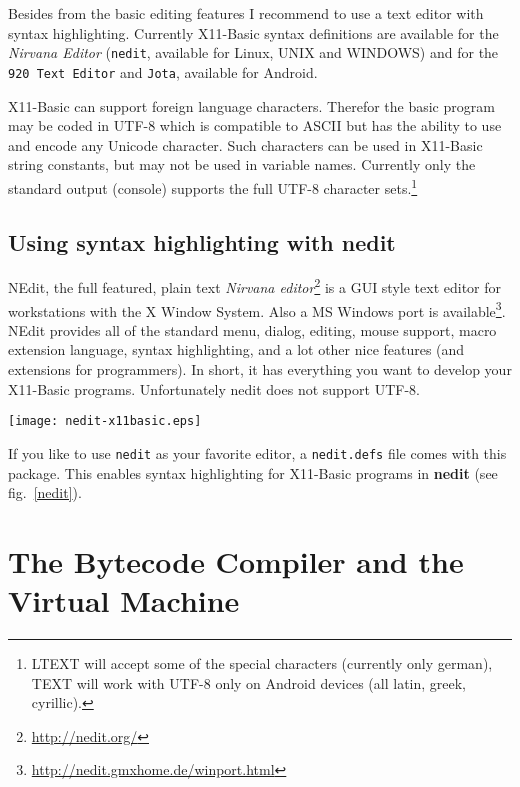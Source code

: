 Besides from the basic editing features I recommend to use a text editor with
syntax highlighting. Currently X11-Basic syntax definitions are available  for
the {\it Nirvana Editor} (\verb|nedit|, available for Linux, UNIX and WINDOWS) 
and for the \verb|920 Text Editor| and \verb|Jota|, available for Android.

X11-Basic can support foreign language characters. Therefor the basic program
may be coded in UTF-8 which is compatible to ASCII but has the  ability to use
and encode any Unicode character. Such characters can be used in X11-Basic
string constants, but may not be used in variable names. Currently  only the
standard output (console) supports the full UTF-8 character
sets.\footnote{LTEXT will accept some of the special characters
(currently only german), TEXT will work with UTF-8 only on Android
devices (all latin, greek, cyrillic). }

\subsection*{Using syntax highlighting with {\bf nedit}}

NEdit, the full featured, plain text {\it Nirvana 
editor}\footnote{\url{http://nedit.org/}} is a GUI style text editor for
workstations with the X Window System.  Also a MS Windows port is
available\footnote{ \url{http://nedit.gmxhome.de/winport.html}}. NEdit provides
all of the standard menu, dialog, editing, mouse support, macro extension
language, syntax highlighting, and a lot other nice features (and extensions for
programmers). In short, it has everything you want to develop your X11-Basic
programs. Unfortunately nedit does not support UTF-8.

\begin{SCfigure}
\texttt{[image: nedit-x11basic.eps]}
\caption{The Nirvana Editor with syntax highlighting for a X11-Basic program.}
\label{nedit}
\end{SCfigure}

If you like to use \verb|nedit| as your favorite editor, a \verb|nedit.defs| file
comes  with this package. This enables syntax highlighting for X11-Basic
programs in {\bf nedit} (see fig.~\ref{nedit}).

\section{The Bytecode Compiler and the Virtual Machine}

